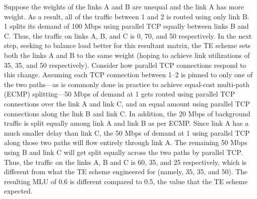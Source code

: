 
Suppose the weights of the links A and B are unequal and the link A has more weight. As a result, all of the traffic between 1 and 2 is routed using only link B. 1 splits its demand of 100 Mbps using parallel TCP equally between links B and C. Thus, the traffic on links A, B, and C is  0, 70, and 50 respectively. In the next step, seeking to balance load better for this resultant matrix, the TE scheme sets both the links A and B to the same weight (hoping to achieve link utilizations of 35, 35, and 50 respectively).  Consider how parallel TCP connections respond to this change.
Assuming each TCP connection between 1--2 is pinned to only one of the two paths---as is commonly done in practice to achieve equal-cost multi-path (ECMP) splitting---50 Mbps of demand at 1 gets routed using parallel TCP connections over the link A and link C, and an equal amount using parallel TCP connections along the link B and link C. In addition, the 20 Mbps of background traffic is split equally among link A and link B as per ECMP.  Since link A has a much smaller delay than link C, the 50 Mbps of demand at 1 using parallel TCP along those two paths will flow entirely through link A. The remaining 50 Mbps using B and link C will get split equally across the two paths by parallel TCP. Thus, the traffic on the links A, B and C is 60, 35, and 25 respectively, which is different from what the TE scheme engineered for (namely, 35, 35, and 50). The resulting MLU of 0.6 is different compared to 0.5, the value that the TE scheme expected. 



